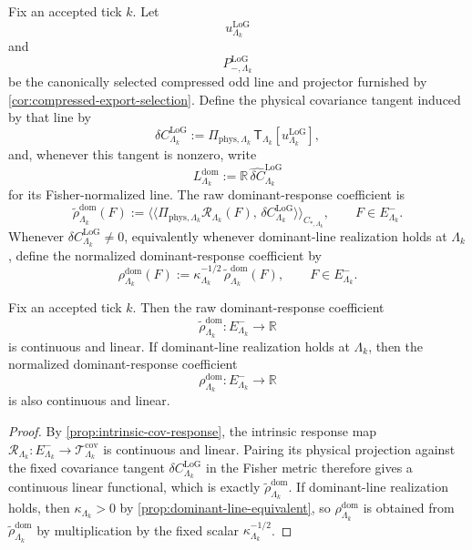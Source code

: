 \documentclass[11pt]{article}
\begin{document}
\begin{definition}
\label{def:dominant-response-functional}
Fix an accepted tick \(k\). Let
\[
u^{\mathrm{LoG}}_{\Lambda_k}
\]
and
\[
P_{-,\Lambda_k}^{\mathrm{LoG}}
\]
be the canonically selected compressed odd line and projector furnished by
\cref{cor:compressed-export-selection}. Define the physical covariance tangent induced by that line by
\[
\delta C^{\mathrm{LoG}}_{\Lambda_k}
:=
\Pi_{\mathrm{phys},\Lambda_k}\,\mathsf T_{\Lambda_k}[u^{\mathrm{LoG}}_{\Lambda_k}],
\]
and, whenever this tangent is nonzero, write
\[
L^{\mathrm{dom}}_{\Lambda_k}
:=
\mathbb R\,\widehat{\delta C}^{\mathrm{LoG}}_{\Lambda_k}
\]
for its Fisher-normalized line.
The raw dominant-response coefficient is
\begin{equation}
\widetilde{\rho}^{\mathrm{dom}}_{\Lambda_k}(F)
:=
\big\langle\!\big\langle
\Pi_{\mathrm{phys},\Lambda_k}\mathcal R_{\Lambda_k}(F),\,
\delta C^{\mathrm{LoG}}_{\Lambda_k}
\big\rangle\!\big\rangle_{C_{\ast,\Lambda_k}},
\qquad
F\in E^-_{\Lambda_k}.
\label{eq:rho-dom-raw-def}
\end{equation}
Whenever \(\delta C^{\mathrm{LoG}}_{\Lambda_k}\neq 0\), equivalently whenever dominant-line
realization holds at \(\Lambda_k\), define the normalized dominant-response coefficient by
\begin{equation}
\rho^{\mathrm{dom}}_{\Lambda_k}(F)
:=
\kappa_{\Lambda_k}^{-1/2}\,
\widetilde{\rho}^{\mathrm{dom}}_{\Lambda_k}(F),
\qquad
F\in E^-_{\Lambda_k}.
\label{eq:rho-dom-def}
\end{equation}
\end{definition}

\begin{proposition}
\label{prop:rho-dom-continuity}
Fix an accepted tick \(k\).
Then the raw dominant-response coefficient
\[
\widetilde{\rho}^{\mathrm{dom}}_{\Lambda_k}:E^-_{\Lambda_k}\to\mathbb R
\]
is continuous and linear.
If dominant-line realization holds at \(\Lambda_k\), then the normalized dominant-response
coefficient
\[
\rho^{\mathrm{dom}}_{\Lambda_k}:E^-_{\Lambda_k}\to\mathbb R
\]
is also continuous and linear.
\end{proposition}

\begin{proof}
By \cref{prop:intrinsic-cov-response}, the intrinsic response map
\(
\mathcal R_{\Lambda_k}:E^-_{\Lambda_k}\to\mathcal T^{\mathrm{cov}}_{\Lambda_k}
\)
is continuous and linear.
Pairing its physical projection against the fixed covariance tangent
\(
\delta C^{\mathrm{LoG}}_{\Lambda_k}
\)
in the Fisher metric therefore gives a continuous linear functional, which is exactly
\(\widetilde{\rho}^{\mathrm{dom}}_{\Lambda_k}\).
If dominant-line realization holds, then \(\kappa_{\Lambda_k}>0\) by
\cref{prop:dominant-line-equivalent}, so \(\rho^{\mathrm{dom}}_{\Lambda_k}\) is obtained from
\(\widetilde{\rho}^{\mathrm{dom}}_{\Lambda_k}\) by multiplication by the fixed scalar
\(\kappa_{\Lambda_k}^{-1/2}\).
\end{proof}
\end{document}
